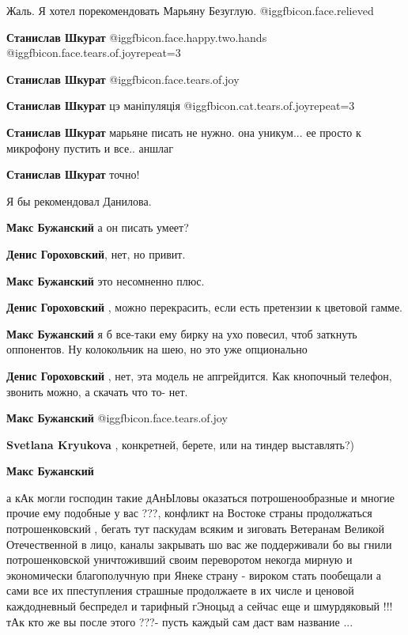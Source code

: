 \begin{itemize}
Жаль. Я хотел порекомендовать Марьяну Безуглую. @igg{fbicon.face.relieved} 

\begin{itemize} %
\textbf{Станислав Шкурат}  @igg{fbicon.face.happy.two.hands}  @igg{fbicon.face.tears.of.joy}{repeat=3} 


\textbf{Станислав Шкурат}  @igg{fbicon.face.tears.of.joy} 

\textbf{Станислав Шкурат} цэ маніпуляція  @igg{fbicon.cat.tears.of.joy}{repeat=3} 


\textbf{Станислав Шкурат} марьяне писать не нужно. она уникум... ее просто к микрофону пустить и все.. аншлаг

\textbf{Станислав Шкурат} точно!
\end{itemize} %


Я бы рекомендовал Данилова.

\begin{itemize} %
\textbf{Макс Бужанский} а он писать умеет?

\textbf{Денис Гороховский}, нет, но привит.

\textbf{Макс Бужанский} это несомненно плюс.

\textbf{Денис Гороховский} , можно перекрасить, если есть претензии к цветовой гамме.

\textbf{Макс Бужанский} я б все-таки ему бирку на ухо повесил, чтоб заткнуть оппонентов. Ну колокольчик на шею, но это уже опционально

\textbf{Денис Гороховский} , нет, эта модель не апгрейдится.
Как кнопочный телефон, звонить можно, а скачать что то- нет.

\textbf{Макс Бужанский}  @igg{fbicon.face.tears.of.joy} 

\textbf{Svetlana Kryukova} , конкретней, берете, или на тиндер выставлять?)

\textbf{Макс Бужанский} 

а кАк могли господин такие дАнЫловы оказаться потрошенообразные и многие прочие
ему подобные у вас ???, конфликт на Востоке страны продолжаться потрошенковский
, бегать тут паскудам всяким и зиговать Ветеранам Великой Отечественной в лицо,
каналы закрывать шо вас же поддерживали бо вы гнили потрошенковской
уничтоживший своим переворотом некогда мирную и экономически благополучную при
Янеке страну - вироком стать пообещали а сами все их ппеступления страшные
продолжаете в их числе и ценовой каждодневный беспредел и тарифный гЭноцыд а
сейчас еще и шмурдяковый !!!тАк кто же вы после этого ???- пусть каждый сам
даст вам название ...


\end{itemize}
\end{itemize}
